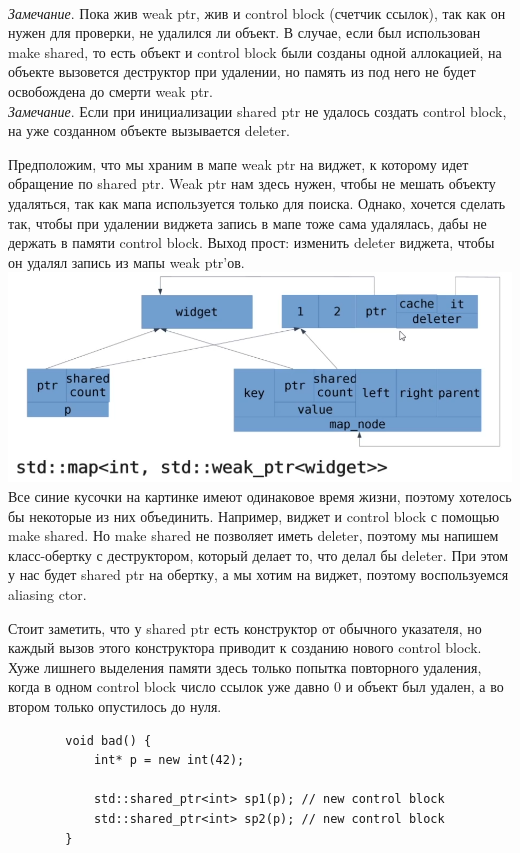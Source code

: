 \documentclass[12pt, a4paper]{article}
\begin{document}
	\\ \textit{Замечание}. Пока жив weak ptr, жив и control block (счетчик ссылок), так как он нужен для проверки, не удалился ли объект. В случае, если был использован make shared, то есть объект и control block были созданы одной аллокацией, на объекте вызовется деструктор при удалении, но память из под него не будет освобождена до смерти weak ptr.\\
	\textit{Замечание}. Если при инициализации shared ptr не удалось создать control block, на уже созданном объекте вызывается deleter.\\
	\par Предположим, что мы храним в мапе weak ptr на виджет, к которому идет обращение по shared ptr. Weak ptr нам здесь нужен, чтобы не мешать объекту удаляться, так как мапа используется только для поиска. Однако, хочется сделать так, чтобы при удалении виджета запись в мапе тоже сама удалялась, дабы не держать в памяти control block. Выход прост: изменить deleter виджета, чтобы он удалял запись из мапы weak ptr'ов.\\
	\includegraphics[scale=0.5]{weak_map.png}\\
	Все синие кусочки на картинке имеют одинаковое время жизни, поэтому хотелось бы некоторые из них объединить. Например, виджет и control block с помощью make shared. Но make shared не позволяет иметь deleter, поэтому мы напишем класс-обертку с деструктором, который делает то, что делал бы deleter. При этом у нас будет shared ptr на обертку, а мы хотим на виджет, поэтому воспользуемся aliasing ctor.
	\\\par Стоит заметить, что у shared ptr есть конструктор от обычного указателя, но каждый вызов этого конструктора приводит к созданию нового control block. Хуже лишнего выделения памяти здесь только попытка повторного удаления, когда в одном control block число ссылок уже давно 0 и объект был удален, а во втором только опустилось до нуля.
	\begin{verbatim}
		void bad() {
			int* p = new int(42);
			
			std::shared_ptr<int> sp1(p); // new control block
			std::shared_ptr<int> sp2(p); // new control block
		}
	\end{verbatim}
\end{document}
